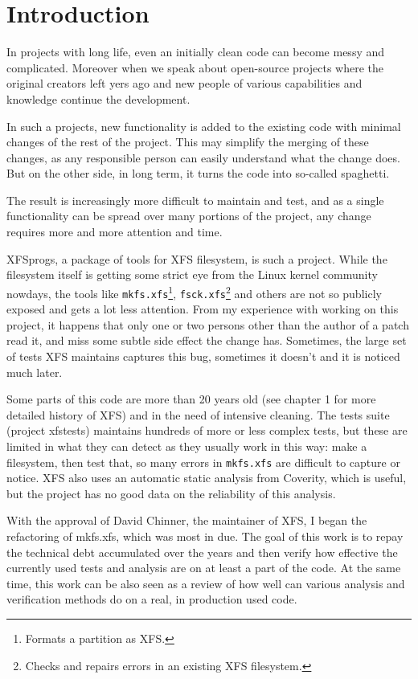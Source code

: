
\chapter{Introduction}\label{chap:introduction}


In projects with long life, even an initially clean code can become messy and complicated. Moreover when we speak about open-source projects where the original creators left yers ago and new people of various capabilities and knowledge continue the development.

In such a projects, new functionality is added to the existing code with minimal changes of the rest of the project. This may simplify the merging of these changes, as any responsible person can easily understand what the change does. But on the other side, in long term, it turns the code into so-called spaghetti.

The result is increasingly more difficult to maintain and test, and as a single functionality can be spread over many portions of the project, any change requires more and more attention and time.

XFSprogs, a package of tools for XFS filesystem, is such a project. While the filesystem itself is getting some strict eye from the Linux kernel community nowdays, the tools like {\tt mkfs.xfs}\footnote{Formats a partition as XFS.}, {\tt fsck.xfs}\footnote{Checks and repairs errors in an existing XFS filesystem.} and others are not so publicly exposed and gets a lot less attention. From my experience with working on this project, it happens that only one or two persons other than the author of a patch read it, and miss some subtle side effect the change has. Sometimes, the large set of tests XFS maintains captures this bug, sometimes it doesn't and it is noticed much later.

Some parts of this code are more than 20 years old (see chapter 1 for more detailed history of XFS) and in the need of intensive cleaning. The tests suite (project xfstests) maintains hundreds of more or less complex tests, but these are limited in what they can detect as they usually work in this way: make a filesystem, then test that, so many errors in {\tt mkfs.xfs} are difficult to capture or notice. XFS also uses an automatic static analysis from Coverity, which is useful, but the project has no good data on the reliability of this analysis.

With the approval of David Chinner, the maintainer of XFS, I began the
refactoring of mkfs.xfs, which was most in due. The goal of this work is to repay the technical debt accumulated over the years and then verify how effective the currently used tests and analysis are on at least a part of the code. At the same time, this work can be also seen as a review of how well can various analysis and verification methods do on a real, in production used code.


